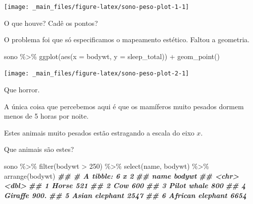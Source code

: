 \documentclass[
  11pt]{report}
\newenvironment{Shaded}{\begin{snugshade}}{\end{snugshade}}
\newcommand{\AttributeTok}[1]{\textcolor[rgb]{0.77,0.63,0.00}{#1}}
\newcommand{\DecValTok}[1]{\textcolor[rgb]{0.00,0.00,0.81}{#1}}
\newcommand{\DocumentationTok}[1]{\textcolor[rgb]{0.56,0.35,0.01}{\textbf{\textit{#1}}}}
\newcommand{\FunctionTok}[1]{\textcolor[rgb]{0.00,0.00,0.00}{#1}}
\newcommand{\NormalTok}[1]{#1}
\newcommand{\SpecialCharTok}[1]{\textcolor[rgb]{0.00,0.00,0.00}{#1}}
\begin{document}
\begin{center}\texttt{[image: \_main\_files/figure-latex/sono-peso-plot-1-1]} \end{center}

O que houve? Cadê os pontos?

O problema foi que só especificamos o mapeamento estético. Faltou a geometria.

\begin{Shaded}
\begin{Highlighting}[]
\NormalTok{sono }\SpecialCharTok{\%\textgreater{}\%} 
  \FunctionTok{ggplot}\NormalTok{(}\FunctionTok{aes}\NormalTok{(}\AttributeTok{x =}\NormalTok{ bodywt, }\AttributeTok{y =}\NormalTok{ sleep\_total)) }\SpecialCharTok{+}
  \FunctionTok{geom\_point}\NormalTok{()}
\end{Highlighting}
\end{Shaded}

\begin{center}\texttt{[image: \_main\_files/figure-latex/sono-peso-plot-2-1]} \end{center}

Que horror.

A única coisa que percebemos aqui é que os mamíferos muito pesados dormem menos de 5 horas por noite.

Estes animais muito pesados estão estragando a escala do eixo \(x\).

Que animais são estes?

\begin{Shaded}
\begin{Highlighting}[]
\NormalTok{sono }\SpecialCharTok{\%\textgreater{}\%} 
  \FunctionTok{filter}\NormalTok{(bodywt }\SpecialCharTok{\textgreater{}} \DecValTok{250}\NormalTok{) }\SpecialCharTok{\%\textgreater{}\%} 
  \FunctionTok{select}\NormalTok{(name, bodywt) }\SpecialCharTok{\%\textgreater{}\%} 
  \FunctionTok{arrange}\NormalTok{(bodywt)}
\DocumentationTok{\#\# \# A tibble: 6 x 2}
\DocumentationTok{\#\#   name             bodywt}
\DocumentationTok{\#\#   \textless{}chr\textgreater{}             \textless{}dbl\textgreater{}}
\DocumentationTok{\#\# 1 Horse              521 }
\DocumentationTok{\#\# 2 Cow                600 }
\DocumentationTok{\#\# 3 Pilot whale        800 }
\DocumentationTok{\#\# 4 Giraffe            900.}
\DocumentationTok{\#\# 5 Asian elephant    2547 }
\DocumentationTok{\#\# 6 African elephant  6654}
\end{Highlighting}
\end{Shaded}
\end{document}

